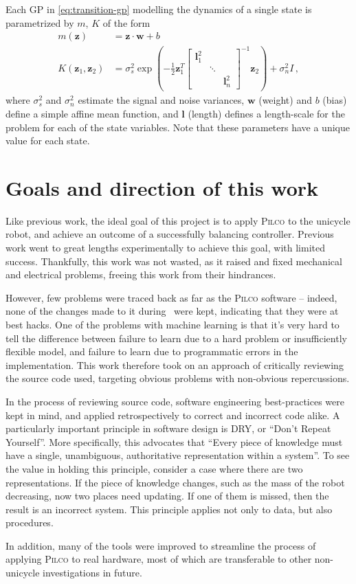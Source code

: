 \documentclass[main.tex]{subfiles}
\begin{document}
		Each GP in \cref{eq:transition-gp} modelling the dynamics of a single state is parametrized by $m$, $K$ of the form
		\begin{align}
			m(\bm{z}) &= \bm{z} \cdot \bm{w} + b \\
			K(\bm{z}_1, \bm{z}_2) &= \sigma_s^2 \exp \left(
				-\frac{1}{2}
				\bm{z}_1^T
				\begin{bmatrix}
					\bm{l}_1^2 && \\
					& \ddots & \\
					&& \bm{l}_n^2
				\end{bmatrix}^{-1}
				\bm{z}_2
			\right) + \sigma_n^2 I \,,
		\end{align}
		where $\sigma_s^2$ and $\sigma_n^2$ estimate the signal and noise variances, $\bm{w}$ (weight) and $b$ (bias) define a simple affine mean function, and $\bm{l}$ (length) defines a length-scale for the problem for each of the state variables.
		Note that these parameters have a unique value for each state.

\section{Goals and direction of this work}
	\label{sec:dry}

	Like previous work, the ideal goal of this project is to apply \textsc{Pilco} to the unicycle robot, and achieve an outcome of a successfully balancing controller.
	Previous work went to great lengths experimentally to achieve this goal, with limited success. Thankfully, this work was not wasted, as it raised and fixed mechanical and electrical problems, freeing this work from their hindrances.

	However, few problems were traced back as far as the \textsc{Pilco} software -- indeed, none of the changes made to it during~\cite{aleksi} were kept, indicating that they were at best hacks.
	One of the problems with machine learning is that it's very hard to tell the difference between failure to learn due to a hard problem or insufficiently flexible model, and failure to learn due to programmatic errors in the implementation.
	This work therefore took on an approach of critically reviewing the source code used, targeting obvious problems with non-obvious repercussions.

	In the process of reviewing source code, software engineering best-practices were kept in mind, and applied retrospectively to correct and incorrect code alike.
	A particularly important principle in software design is DRY, or \enquote{Don't Repeat Yourself}.
	More specifically, this advocates that \enquote{Every piece of knowledge must have a single, unambiguous, authoritative representation within a system}\cite{dry}.
	To see the value in holding this principle, consider a case where there are two representations. If the piece of knowledge changes, such as the mass of the robot decreasing, now two places need updating. If one of them is missed, then the result is an incorrect system. This principle applies not only to data, but also procedures.

	In addition, many of the tools were improved to streamline the process of applying \textsc{Pilco} to real hardware, most of which are transferable to other non-unicycle investigations in future.


\bib
\end{document}
